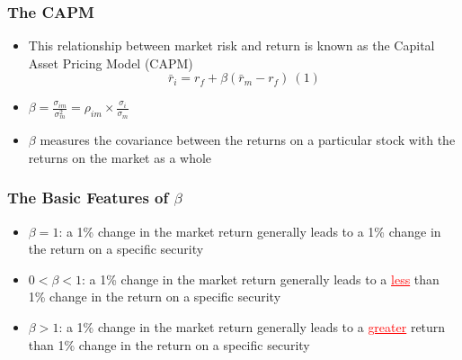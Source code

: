 \documentclass[9pt,aspectratio=169]{beamer}
\begin{document}

\begin{frame}

\frametitle{\textnormal{The CAPM}}


\begin{itemize}
    \item This relationship between market risk and return is known as the Capital Asset Pricing Model (CAPM)
$$
\bar{r}_i = r_f + \beta(\bar{r}_m - r_f) \ (1)$$

\item $\beta = \frac{\sigma_{im}}{\sigma_m^2} = \rho_{im} \times \frac{\sigma_i}{\sigma_m}$

\item $\beta$ measures the covariance between the returns on a particular stock with the returns on the market as a whole


\end{itemize}


\end{frame}




\begin{frame}

\frametitle{\textnormal{The Basic Features of $\beta$}}


\begin{itemize}
    \item $\beta = 1$: a 1\% change in the market return generally leads to a 1\% change in the return on a specific security
\item $0 < \beta < 1$: a 1\% change in the market return generally leads to a \textcolor{red}{\underline{less}} than 1\% change in the return on a specific security
\item $\beta > 1$: a 1\% change in the market return generally leads to a \textcolor{red}{\underline{greater}} return than 1\% change in the return on a specific security

\end{itemize}




\end{frame}
\end{document}
